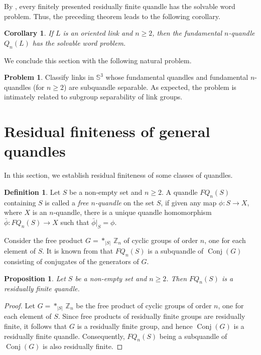 \documentclass[12pt]{amsart}
\newtheorem{corollary}[theorem]{Corollary}
\newtheorem{prop}[theorem]{Proposition}
\theoremstyle{definition}
\newtheorem{problem}[theorem]{Problem}
\newtheorem{definition}[theorem]{Definition}
\numberwithin{equation}{subsection}
\newcommand{\Conj}{\operatorname{Conj}}
\begin{document}
By \cite[Theorem 5.11]{MR3981139}, every finitely presented residually finite quandle has the solvable word problem. Thus, the preceding theorem leads to the following corollary.

\begin{corollary}
If $L$ is an oriented link and $n \ge 2$, then the fundamental $n$-quandle $Q_n(L)$ has the solvable word problem.
\end{corollary}

We conclude this section with the following natural problem.

\begin{problem}
Classify links in $\mathbb{S}^3$ whose fundamental quandles and fundamental $n$-quandles (for $n \ge 2$) are subquandle separable. As expected, the problem is intimately related to subgroup separability of link groups.
\end{problem}
\medskip


\section{Residual finiteness of general quandles}
In this section, we establish residual finiteness of some classes of  quandles.

\begin{definition}
Let $S$ be a non-empty set and $n \ge 2$.  A quandle $FQ_n(S)$ containing $S$ is called a {\it free $n$-quandle} on the set $S$, if given any map $\phi:S\to X$, where $X$ is an $n$-quandle, there is a unique quandle homomorphism $\bar{\phi}:FQ_n(S)\to X$ such that $\bar{\phi}|_S= \phi$.
\end{definition}

Consider the free product $G=\ast_{|S|} \, \mathbb{Z}_n$ of cyclic groups of order $n$, one for each element of $S$. It is known from \cite[Section 2.11, Corollary 2]{Joyce1979} that $FQ_n(S)$ is a subquandle of $\Conj(G)$ consisting of conjugates of the generators of $G$.


\begin{prop} Let $S$ be a non-empty set and $n \ge 2$. Then $FQ_n(S)$ is a residually finite quandle.
\end{prop}

\begin{proof}
Let $G=\ast_{|S|}\,\mathbb{Z}_n$ be the free product of cyclic groups of order $n$, one for each element of $S$. Since free products of residually finite groups are residually finite, it follows that $G$ is a residually finite group, and hence $\Conj(G)$ is a residually finite quandle. Consequently, $FQ_n(S)$ being a subquandle of $\Conj(G)$ is also residually finite. 
\end{proof}
\end{document}
